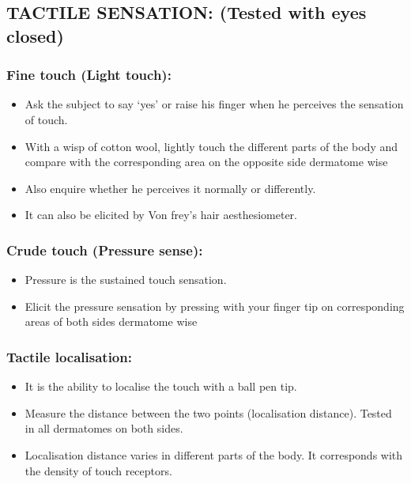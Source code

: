 \documentclass[a4paper,12pt]{book}
\begin{document}
\subsection*{TACTILE SENSATION: (Tested with eyes closed)}
\subsubsection*{Fine touch (Light touch):}
\begin{itemize}
\item{ Ask the subject to say ‘yes’ or raise his finger when he perceives the sensation of touch.}
\item{ With a wisp of cotton wool, lightly touch the different parts of the body and compare with the corresponding area on the opposite side dermatome wise}
\item{ Also enquire whether he perceives it normally or differently.}
\item{ It can also be elicited by Von frey’s hair aesthesiometer.}
\end{itemize}

\subsubsection*{Crude touch (Pressure sense):}
\begin{itemize}
\item{Pressure is the sustained touch sensation.}
\item{Elicit the pressure sensation by pressing with your finger tip on 	corresponding areas of both sides dermatome wise}
\end{itemize}

\subsubsection*{Tactile localisation:}
\begin{itemize}
\item{It is the ability to localise the touch with a ball pen tip.}
\item{Measure the distance between the two points (localisation distance).  Tested in all dermatomes on both sides.}
\item{Localisation distance varies in different parts of the body. It corresponds with the density of touch receptors.}
\end{itemize}
\end{document}
